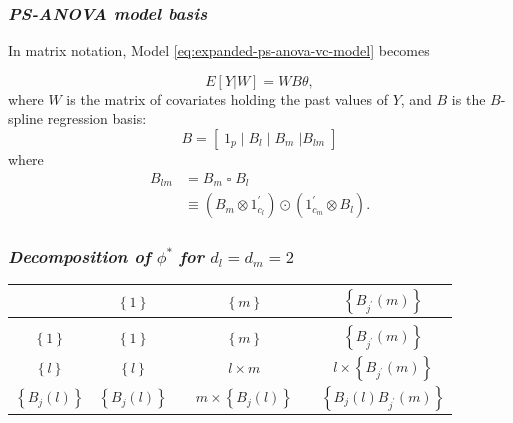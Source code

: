 \documentclass[12pt]{beamer}
\newcommand{\ms}{\scriptscriptstyle}
\begin{document}
\begin{frame}
\frametitle{\emph{PS-ANOVA model basis}}

In matrix notation, Model \ref{eq:expanded-ps-anova-vc-model} becomes

\begin{equation*}  
E \left[ Y | W \right] = WB \theta,
\end{equation*}
\noindent
where $W$ is the matrix of covariates holding the past values of $Y$, and $B$ is the $B$-spline regression basis:
\begin{equation} \label{eq:SANOVA-basis-matrix}
B = \left[\; 1_p \; \vert \;  B_l  \; \vert \;   B_m \; \vert B_{lm} \; \right]
\end{equation}
\noindent
where 
\begin{align*} \label{eq:rowwise-kronecker-product}
B_{lm} &= B_m \; \square \; B_l \\
&\equiv \left( B_m \otimes 1^\prime_{c_l} \right) \odot \left(1^\prime_{c_m} \otimes  B_l  \right).
\end{align*}
\end{frame}





\begin{frame}
\frametitle{\emph{Decomposition of} $\phi^*$ \emph{for} $d_l = d_m = 2$}


\begin{table}[h]
\centering %
\begin{tabular}{c|ccccc}
	&    $\left\{ 1 \right\}$	&&	$\left\{m \right\}$	 	&& 	$\left\{ B_{\ms{j^\prime}}\left(m\right) \right\} $ \\ [0.5ex]
\hline %
\\
$\left\{ 1 \right\}$ 				&  $\left\{ 1 \right\}$   	& &	$\left\{m \right\}$	 	&& 	$\left\{ B_{\ms{j^\prime}}\left(m\right) \right\} $	\\  [2.5ex] %
$\left\{l \right\}$		 		&  $\left\{ l \right\}$  	 &&	$l \times m$	 	&& 	$l \times \left\{   B_{\ms{j^\prime}}\left(m\right) \right\} $\\  [2.5ex]
$\left\{ B_j\left(l\right) \right\} $	 	&    $\left\{ B_j\left(l\right) \right\}$	&&	$ m \times \left\{ B_j\left(l\right) \right\}$	& &	$\left\{ B_j\left(l\right) B_{\ms{j^\prime}}\left(m\right) \right\}$ 
\end{tabular}
\end{table}

\end{frame}
\end{document}
